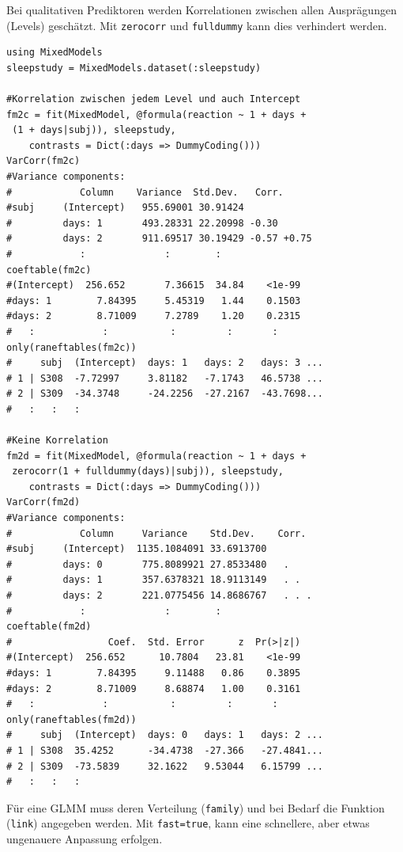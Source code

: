 \documentclass[10pt,twocolumn]{scrartcl}
\begin{document}
Bei qualitativen Prediktoren werden Korrelationen zwischen allen Ausprägungen (Levels) geschätzt. Mit \lstinline|zerocorr| und \lstinline|fulldummy| kann dies verhindert werden.

\begin{lstlisting}
using MixedModels
sleepstudy = MixedModels.dataset(:sleepstudy)

#Korrelation zwischen jedem Level und auch Intercept
fm2c = fit(MixedModel, @formula(reaction ~ 1 + days +
 (1 + days|subj)), sleepstudy,
    contrasts = Dict(:days => DummyCoding()))
VarCorr(fm2c)
#Variance components:
#            Column    Variance  Std.Dev.   Corr.
#subj     (Intercept)   955.69001 30.91424
#         days: 1       493.28331 22.20998 -0.30
#         days: 2       911.69517 30.19429 -0.57 +0.75
#            :              :        :
coeftable(fm2c)
#(Intercept)  256.652       7.36615  34.84    <1e-99
#days: 1        7.84395     5.45319   1.44    0.1503
#days: 2        8.71009     7.2789    1.20    0.2315
#   :            :           :         :       :
only(raneftables(fm2c))
#     subj  (Intercept)  days: 1   days: 2   days: 3 ...
# 1 | S308  -7.72997     3.81182   -7.1743   46.5738 ...
# 2 | S309  -34.3748     -24.2256  -27.2167  -43.7698...
#   :   :   :

#Keine Korrelation
fm2d = fit(MixedModel, @formula(reaction ~ 1 + days +
 zerocorr(1 + fulldummy(days)|subj)), sleepstudy,
    contrasts = Dict(:days => DummyCoding()))
VarCorr(fm2d)
#Variance components:
#            Column     Variance    Std.Dev.    Corr.
#subj     (Intercept)  1135.1084091 33.6913700
#         days: 0       775.8089921 27.8533480   .
#         days: 1       357.6378321 18.9113149   . .
#         days: 2       221.0775456 14.8686767   . . .
#            :              :        :
coeftable(fm2d)
#                 Coef.  Std. Error      z  Pr(>|z|)
#(Intercept)  256.652      10.7804   23.81    <1e-99
#days: 1        7.84395     9.11488   0.86    0.3895
#days: 2        8.71009     8.68874   1.00    0.3161
#   :            :           :         :       :
only(raneftables(fm2d))
#     subj  (Intercept)  days: 0   days: 1   days: 2 ...
# 1 | S308  35.4252      -34.4738  -27.366   -27.4841...
# 2 | S309  -73.5839     32.1622   9.53044   6.15799 ...
#   :   :   :
\end{lstlisting}

Für eine GLMM muss deren Verteilung (\lstinline|family|) und bei Bedarf die
Funktion (\lstinline|link|) angegeben werden. Mit \lstinline|fast=true|, kann eine schnellere, aber etwas ungenauere Anpassung erfolgen.
\end{document}
